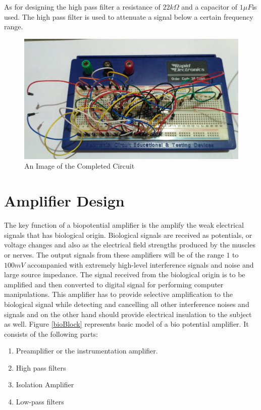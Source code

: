\documentclass[11pt,a4paper,headinclude=false,footinclude=false]{scrreprt}
\begin{document}
As for designing the high pass filter a resistance of \(22k\Omega\) and
a capacitor of \(1\mu F\)is used. The high pass filter is used to
attenuate a signal below a certain frequency range.

\begin{figure}[H]
\includegraphics{Images/Hardware/CircuitPhoto.jpg}
\centering
\caption{An Image of the Completed Circuit}
\label{circuitphoto}
\end{figure}

\hypertarget{amplifier-design}{%
\section{Amplifier Design}\label{amplifier-design}}

The key function of a biopotential amplifier is the amplify the weak
electrical signals that has biological origin. Biological signals are
received as potentials, or voltage changes and also as the electrical
field strengths produced by the muscles or nerves. The output signals
from these amplifiers will be of the range \(1\) to \(100mV\)
accompanied with extremely high-level interference signals and noise and
large source impedance. The signal received from the biological origin
is to be amplified and then converted to digital signal for performing
computer manipulations. This amplifier has to provide selective
amplification to the biological signal while detecting and cancelling
all other interference noises and signals and on the other hand should
provide electrical insulation to the subject as well\cite{BioAmp}.
Figure \ref{bioBlock} represents basic model of a bio potential
amplifier. It consists of the following parts:

\begin{enumerate}
\item Preamplifier or the instrumentation amplifier.
\item High pass filters
\item Isolation Amplifier
\item Low-pass filters
\end{enumerate}
\end{document}
